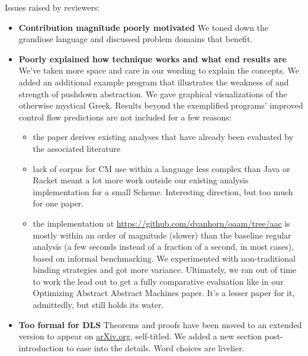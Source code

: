 \begin{titlepage}
  \begin{center}
    \Huge{Issues raised by reviewers:}
  \end{center}
  \begin{itemize}
  \item{\textbf{Contribution magnitude poorly motivated}
      We toned down the grandiose language and discussed problem domains that benefit.}
  \item{\textbf{Poorly explained how technique works and what end results are}
      We've taken more space and care in our wording to explain the concepts.
      We added an additional example program that illustrates the weakness of \zcfa{} and strength of pushdown abstraction.
%
      We gave graphical visualizations of the otherwise mystical Greek.
%
    Results beyond the exemplified programs' improved control flow predictions are not included for a few reasons:
    \begin{itemize}
    \item{the paper derives existing analyses that have already been evaluated by the associated literature}
    \item{lack of corpus for CM use within a language less complex than Java or Racket meant a lot more work outside our existing analysis implementation for a small Scheme.
%
Interesting direction, but too much for one paper.}
    \item{the implementation at \url{https://github.com/dvanhorn/oaam/tree/aac} is mostly within an order of magnitude (slower) than the baseline regular analysis (a few seconds instead of a fraction of a second, in most cases), based on informal benchmarking.
We experimented with non-traditional binding strategies and got more variance.
%
Ultimately, we ran out of time to work the lead out to get a fully comparative evaluation like in our Optimizing Abstract Abstract Machines paper.
%
It's a lesser paper for it, admittedly, but still holds its water.}
    \end{itemize}
  }
  \item{\textbf{Too formal for DLS}
      Theorems and proofs have been moved to an extended version to appear on \url{arXiv.org}, self-titled.
      We added a new section post-introduction to ease into the details.
      Word choices are livelier.}
  \end{itemize}
\end{titlepage}
